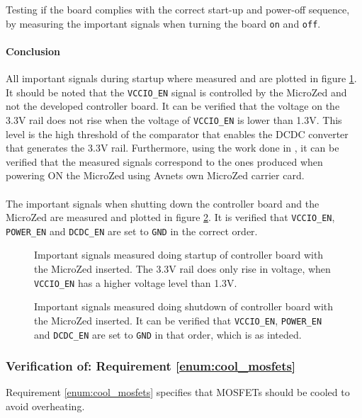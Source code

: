 Testing if the board complies with the correct start-up and power-off sequence, by measuring the important signals when turning the board \texttt{on} and \texttt{off}.

\paragraph{Conclusion}
All important signals during startup where measured and are plotted in figure \ref{fig:controllerboardv2_startup}.
It should be noted that the \texttt{VCCIO\_EN} signal is controlled by the MicroZed and not the developed controller board. 
It can be verified that the voltage on the 3.3V rail does not rise when the voltage of \texttt{VCCIO\_EN} is lower than 1.3V.
This level is the high threshold of the comparator that enables the DCDC converter that generates the 3.3V rail.
Furthermore, using the work done in \cite{isaswarm}, it can be verified that the measured signals correspond to the ones produced when powering ON the MicroZed using Avnets own MicroZed carrier card.
\\~\\
The important signals when shutting down the controller board and the MicroZed are measured and plotted in figure \ref{fig:controllerboardv2_shutdown}.
It is verified that \texttt{VCCIO\_EN}, \texttt{POWER\_EN} and \texttt{DCDC\_EN} are set to \texttt{GND} in the correct order. 

\begin{figure}[h]
	\centering
	\caption[Signals measured doing startup of controller board.]{Important signals measured doing startup of controller board with the MicroZed inserted. The 3.3V rail does only rise in voltage, when \texttt{VCCIO\_EN} has a higher voltage level than 1.3V.}
	\label{fig:controllerboardv2_startup}
\end{figure}

\begin{figure}[h]
	\centering
	\caption[Signals measured doing shutdown of controller board.]{Important signals measured doing shutdown of controller board with the MicroZed inserted. It can be verified that \texttt{VCCIO\_EN}, \texttt{POWER\_EN} and \texttt{DCDC\_EN} are set to \texttt{GND} in that order, which is as inteded.}
	\label{fig:controllerboardv2_shutdown}
\end{figure}

\subsubsection{Verification of: Requirement \ref{enum:cool_mosfets}} %
\label{ssub:requirement_ref_enum:cool_mosfets}
Requirement \ref{enum:cool_mosfets} specifies that MOSFETs should be cooled to avoid overheating. 


